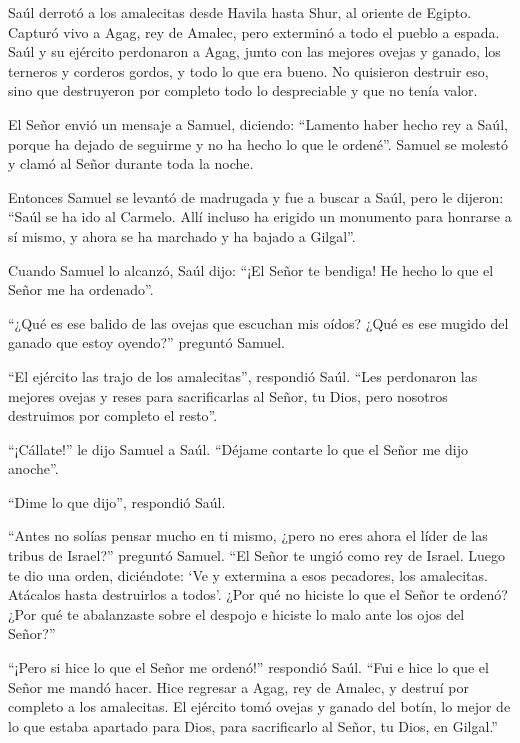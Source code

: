  Saúl derrotó a los amalecitas desde Havila hasta Shur, al
oriente de Egipto.  Capturó vivo a Agag, rey de Amalec, pero
exterminó a todo el pueblo a espada.  Saúl y su ejército
perdonaron a Agag, junto con las mejores ovejas y ganado, los terneros y
corderos gordos, y todo lo que era bueno. No quisieron destruir eso,
sino que destruyeron por completo todo lo despreciable y que no tenía
valor.

 El Señor envió un mensaje a Samuel, diciendo:
 ``Lamento haber hecho rey a Saúl, porque ha dejado de
seguirme y no ha hecho lo que le ordené''. Samuel se molestó y clamó al
Señor durante toda la noche.

 Entonces Samuel se levantó de madrugada y fue a buscar a
Saúl, pero le dijeron: ``Saúl se ha ido al Carmelo. Allí incluso ha
erigido un monumento para honrarse a sí mismo, y ahora se ha marchado y
ha bajado a Gilgal''.

 Cuando Samuel lo alcanzó, Saúl dijo: ``¡El Señor te
bendiga! He hecho lo que el Señor me ha ordenado''.

 ``¿Qué es ese balido de las ovejas que escuchan mis oídos?
¿Qué es ese mugido del ganado que estoy oyendo?'' preguntó Samuel.

 ``El ejército las trajo de los amalecitas'', respondió
Saúl. ``Les perdonaron las mejores ovejas y reses para sacrificarlas al
Señor, tu Dios, pero nosotros destruimos por completo el resto''.

 ``¡Cállate!'' le dijo Samuel a Saúl. ``Déjame contarte lo
que el Señor me dijo anoche''.

``Dime lo que dijo'', respondió Saúl.

 ``Antes no solías pensar mucho en ti mismo, ¿pero no eres
ahora el líder de las tribus de Israel?'' preguntó Samuel. ``El Señor te
ungió como rey de Israel.  Luego te dio una orden,
diciéndote: `Ve y extermina a esos pecadores, los amalecitas. Atácalos
hasta destruirlos a todos'.  ¿Por qué no hiciste lo que el
Señor te ordenó? ¿Por qué te abalanzaste sobre el despojo e hiciste lo
malo ante los ojos del Señor?''

 ``¡Pero si hice lo que el Señor me ordenó!'' respondió
Saúl. ``Fui e hice lo que el Señor me mandó hacer. Hice regresar a Agag,
rey de Amalec, y destruí por completo a los amalecitas.  El
ejército tomó ovejas y ganado del botín, lo mejor de lo que estaba
apartado para Dios, para sacrificarlo al Señor, tu Dios, en Gilgal.''

